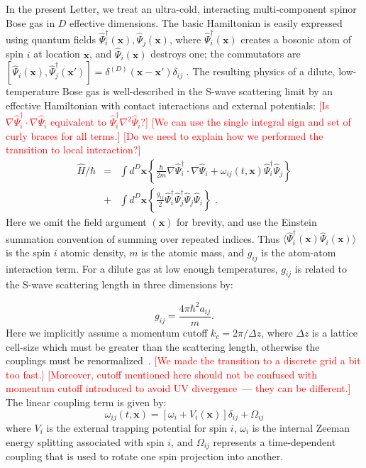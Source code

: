 \documentclass[aps,prl,twocolumn,showpacs,amsmath,amssymb,superscriptaddress]{revtex4-1}
\newcommand{\remark}[1]{\textcolor{red}{{[}#1{]}}}
\begin{document}
{In the present Letter, we treat an ultra-cold,
interacting multi-component spinor Bose gas in $D$ effective dimensions.
The basic Hamiltonian is easily expressed using quantum fields
$\widehat{\Psi}_{i}^{\dagger}({\mathbf{x}}),\widehat{\Psi}_{j}({\mathbf{x}})$,
where $\widehat{\Psi}_{i}^{\dagger}({\mathbf{x}})$ creates a bosonic atom of spin $i$
at location $\mathbf{x}$, and $\widehat{\Psi}_{i}({\mathbf{x}})$ destroys one;
the commutators are
$[\widehat{\Psi}_{i}(\mathbf{x}),\widehat{\Psi}_{j}^{\dagger}(\mathbf{x}')] =
\delta^{(D)}(\mathbf{x}-\mathbf{x}')\delta_{ij}\,\,.$
The resulting physics of a dilute, low-temperature Bose gas
is well-described in the S-wave scattering limit by an effective Hamiltonian
with contact interactions and external potentials:
	\remark{Is $\nabla \widehat{\Psi}_{i}^{\dagger} \cdot \nabla \widehat{\Psi}_{i}$
	equivalent to $\widehat{\Psi}_{i}^{\dagger} \nabla^2 \widehat{\Psi}_{i}$?}
	\remark{We can use the single integral sign and set of curly braces for all terms.}
	\remark{Do we need to explain how we performed the transition to local interaction?}
\begin{eqnarray}
	\widehat{H}/\hbar & = & \int d^{D}{\mathbf{x}} \left\{
		\frac{\hbar}{2m}{\nabla} \widehat{\Psi}_{i}^{\dagger} \cdot {\nabla} \widehat{\Psi}_{i} +
		\omega_{ij}(t,{\mathbf{x}}) \widehat{\Psi}_{i}^{\dagger} \widehat{\Psi}_{j}
	\right\} \nonumber \\
	& + & \int d^{D}{\mathbf{x}} \left\{
		\frac{g_{ij}}{2} \widehat{\Psi}_{i}^{\dagger} \widehat{\Psi}_{j}^{\dagger}
		\widehat{\Psi}_{j} \widehat{\Psi}_{i}
	\right\} \,\,.
\end{eqnarray}
Here we omit the field argument $({\mathbf{x}})$ for brevity,
and use the Einstein summation convention of summing over repeated indices.
Thus $\langle \widehat{\Psi}_{i}^{\dagger}({\mathbf{x}}) \widehat{\Psi}_{i}({\mathbf{x}}) \rangle$
is the spin $i$ atomic density, $m$ is the atomic mass,
and $g_{ij}$ is the atom-atom interaction term.
For a dilute gas at low enough temperatures,
$g_{ij}$ is related to the S-wave scattering length in three dimensions by:

\begin{equation}
	g_{ij}=\frac{4\pi\hbar^{2}a_{ij}}{m}.
\end{equation}
Here we implicitly assume a momentum cutoff $k_{c}=2\pi/\Delta z$,
where $\Delta z$ is a lattice cell-size which must be greater than the scattering length,
otherwise the couplings must be renormalized~\cite{Sinatra2002}.
	\remark{We made the transition to a discrete grid a bit too fast.}
	\remark{Moreover, cutoff mentioned here should not be confused with momentum cutoff
	introduced to avoid UV divergence~--- they can be different.}
The linear coupling term is given by:
\begin{equation}
	\omega_{ij}(t,{\mathbf{x}}) = \left[
		\omega_{i}+V_{i} \left( \mathbf{x} \right)
	\right] \delta_{ij} + \Omega_{ij}
\end{equation}
where $V_{i}$ is the external trapping potential for spin $i$,
$\omega_{i}$ is the internal Zeeman energy splitting associated with spin $i$,
and $\Omega_{ij}$ represents a time-dependent coupling
that is used to rotate one spin projection into another.

}
\end{document}
